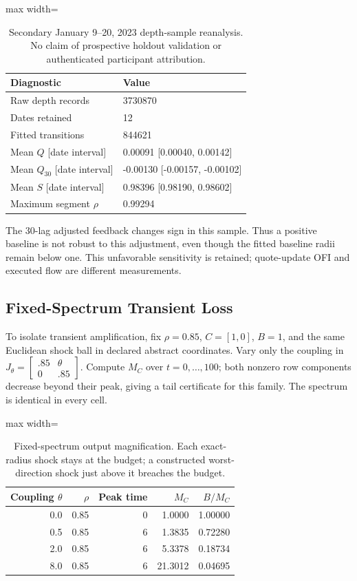 \documentclass[12pt]{article}
\theoremstyle{definition}
\theoremstyle{remark}
\begin{document}
\begin{table}[htbp]
\centering\small
\caption{Secondary January 9--20, 2023 depth-sample reanalysis. No claim of prospective holdout validation or authenticated participant attribution.}
\label{tab:depth_revised}
\begin{adjustbox}{max width=\textwidth}
\begin{tabular}{ll}\toprule
Diagnostic & Value \\\midrule
Raw depth records & 3730870 \\
Dates retained & 12 \\
Fitted transitions & 844621 \\
Mean $Q$ [date interval] & 0.00091 [0.00040, 0.00142] \\
Mean $Q_{30}$ [date interval] & -0.00130 [-0.00157, -0.00102] \\
Mean $S$ [date interval] & 0.98396 [0.98190, 0.98602] \\
Maximum segment $\rho$ & 0.99294 \\
\bottomrule\end{tabular}
\end{adjustbox}
\end{table}
The 30-lag adjusted feedback changes sign in this sample. Thus a positive baseline is not robust to this adjustment, even though the fitted baseline radii remain below one. This unfavorable sensitivity is retained; quote-update OFI and executed flow are different measurements.


\subsection{Fixed-Spectrum Transient Loss}
To isolate transient amplification, fix $\rho=0.85$, $C=[1,0]$, $B=1$, and the same Euclidean shock ball in declared abstract coordinates. Vary only the coupling in $J_\theta=\left[\begin{smallmatrix}.85&\theta\\0&.85\end{smallmatrix}\right]$. Compute $M_C$ over $t=0,\ldots,100$; both nonzero row components decrease beyond their peak, giving a tail certificate for this family. The spectrum is identical in every cell.

\begin{table}[htbp]
\centering\small
\caption{Fixed-spectrum output magnification. Each exact-radius shock stays at the budget; a constructed worst-direction shock just above it breaches the budget.}
\label{tab:transient_revised}
\begin{adjustbox}{max width=\textwidth}
\begin{tabular}{rrrrr}\toprule
Coupling $\theta$ & $\rho$ & Peak time & $M_C$ & $B/M_C$ \\\midrule
0.0 & 0.85 & 0 & 1.0000 & 1.00000 \\
0.5 & 0.85 & 6 & 1.3835 & 0.72280 \\
2.0 & 0.85 & 6 & 5.3378 & 0.18734 \\
8.0 & 0.85 & 6 & 21.3012 & 0.04695 \\
\bottomrule\end{tabular}
\end{adjustbox}
\end{table}
\end{document}
